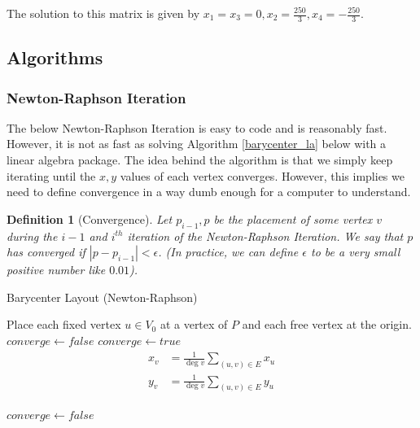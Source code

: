 \documentclass[11pt]{report}
\newcommand{\abs}[1]{\left|#1\right|}
\newtheorem{defn}{Definition}[section]
\begin{document}
The solution to this matrix is given by $x_1 = x_3 = 0, x_2 = \frac{250}{3}, x_4 = -\frac{250}{3}$.

\subsection{Algorithms}
\subsubsection{Newton-Raphson Iteration}
The below Newton-Raphson Iteration is easy to code and is reasonably fast. However, it is not as fast as solving Algorithm \ref{barycenter_la} below with a linear algebra package. The idea behind the algorithm is that we simply keep iterating until the $x, y$ values of each vertex converges. However, this implies we need to define convergence in a way dumb enough for a computer to understand.

\begin{defn}[Convergence]
    Let $p_{i - 1}, p$ be the placement of some vertex $v$ during the $i - 1$ and $i^{th}$ iteration of the Newton-Raphson Iteration. We say that $p$ has converged if $\abs{p - p_{i - 1}} < \epsilon$. (In practice, we can define $\epsilon$ to be a very small positive number like $0.01$).
\end{defn}

\begin{algorithm}[H]
    \caption{Barycenter Layout (Newton-Raphson)}
    \begin{algorithmic}[1]
        \State Place each fixed vertex $u \in V_0$ at a vertex of $P$ and each free vertex at the origin.
        \State $converge \gets false$
            \State $converge \gets true$
                \[
                \begin{aligned}
                x_v &= \frac{1}{\deg{v}} \sum_{(u, v) \in E} x_u \\
                y_v &= \frac{1}{\deg{v}} \sum_{(u, v) \in E} y_u \\
                \end{aligned}
                \]
                
                \State {}
                    \State $converge \gets false$
                \EndIf
            \EndFor
        \EndWhile
        \EndProcedure
    \end{algorithmic}
\end{algorithm}
\end{document}
